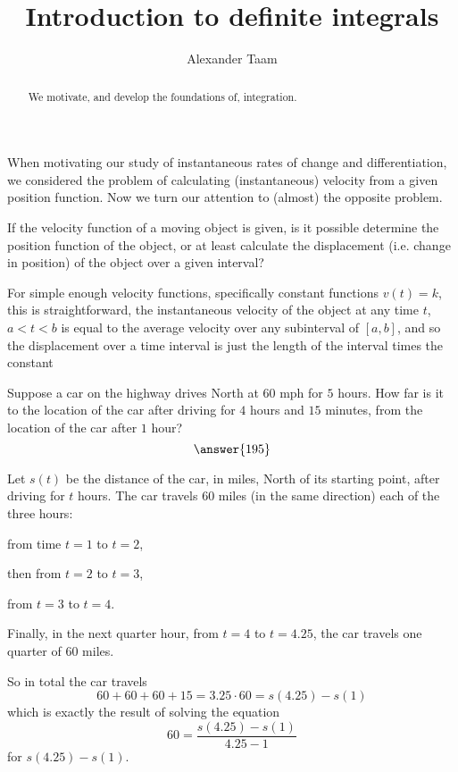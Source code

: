 \documentclass{ximera}
\title{Introduction to definite integrals}
\author{Alexander Taam}
\begin{document}
\begin{abstract}
  We motivate, and develop the foundations of, integration.
\end{abstract}
\maketitle

When motivating our study of instantaneous rates of change and differentiation, we considered the problem of calculating (instantaneous) velocity from a given position function. Now we turn our attention to (almost) the opposite problem. \begin{question}If the velocity function of a moving object is given, is it possible determine the position function of the object, or at least calculate the displacement (i.e. change in position) of the object over a given interval?
\end{question}

\begin{foldable}
For simple enough velocity functions, specifically constant functions $v(t)=k$, this is straightforward, the instantaneous velocity of the object at any time $t$, $a<t<b$ is equal to the average velocity over any subinterval of $[a,b]$, and so the displacement over a time interval is just the length of the interval times the constant
\end{foldable}

\begin{example}
Suppose a car on the highway drives North at $60$ mph for $5$ hours. How far is it to the location of the car after driving for $4$ hours and $15$ minutes, from the location of the car after $1$ hour? \[\answer{195}\]

\begin{feedback} Let $s(t)$ be the distance of the car, in miles, North of its starting point, after driving for $t$ hours. The car travels $60$ miles (in the same direction) each of the three hours: 

from time $t=1$ to $t=2$, 

then from $t=2$ to $t=3$, 

from $t=3$ to $t=4$. 

Finally, in the next quarter hour, from $t=4$ to $t=4.25$, the car travels one quarter of $60$ miles. 

So in total the car travels \[60+60+60+15=3.25\cdot60=s(4.25)-s(1)\] which is exactly the result of solving the equation \[60=\frac{s(4.25)-s(1)}{4.25-1}\] for $s(4.25)-s(1)$.
\end{feedback}
\end{example}
\end{document}
